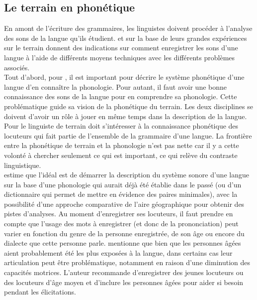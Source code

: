 \subsection{Le terrain en phonétique}\label{subsec:lademad}

En amont de l'écriture des grammaires, les linguistes doivent procéder à l'analyse des sons de la langue qu'ils étudient. \textcite{ladefogedPhoneticDataAnalysis2003} et \textcite{maddiesonPhoneticFieldwork2001} sur la base de leurs grandes expériences sur le terrain donnent des indications sur comment enregistrer les sons d'une langue à l'aide de différents moyens techniques avec les différents problèmes associés.\\


Tout d'abord, pour \textcite{ladefogedPhoneticDataAnalysis2003}, il est important pour décrire le système phonétique d'une langue d'en connaître la phonologie. Pour autant, il faut avoir une bonne connaissance des sons de la langue pour en comprendre sa phonologie. 
Cette problématique guide sa vision de la phonétique du terrain. Les deux disciplines se doivent d'avoir un rôle à jouer en même temps dans la description de la langue. Pour \textcite[212]{maddiesonPhoneticFieldwork2001} le linguiste de terrain doit s'intéresser à la connaissance phonétique des locuteurs qui fait partie de l'ensemble de la grammaire d'une langue. La frontière entre la phonétique de terrain et la phonologie n'est pas nette car il y a cette volonté à chercher seulement ce qui est important, ce qui relève du contraste linguistique.\\


\textcite{ladefogedPhoneticDataAnalysis2003} estime que l'idéal est de démarrer la description du système sonore d'une langue sur la base d'une phonologie qui aurait déjà été établie dans le passé (ou d'un dictionnaire qui permet de mettre en évidence des paires minimales), avec la possibilité d'une approche comparative de l'aire géographique pour obtenir des pistes d'analyses. Au moment d'enregistrer ses locuteurs, il faut prendre en compte que l'usage des mots à enregistrer (et donc de la prononciation) peut varier en fonction du genre de la personne enregistrée, de son âge ou encore du dialecte que cette personne parle. \textcite{maddiesonPhoneticFieldwork2001} mentionne que bien que les personnes âgées aient probablement été les plus exposées à la langue, dans certains cas leur articulation peut être problématique, notamment en raison d'une diminution des capacités motrices. L'auteur recommande d'enregistrer des jeunes locuteurs ou des locuteurs d'âge moyen et d'inclure les personnes âgées pour aider si besoin pendant les élicitations.\\

